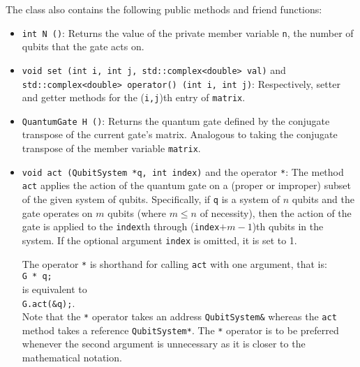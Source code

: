 \documentclass{article}
\begin{document}
The class also contains the following public methods and friend functions: 
\begin{itemize} 
\item \verb~int N ()~: Returns the value of the private member variable \verb~n~, the number of qubits that the gate acts on.

\item \verb~void set (int i, int j, std::complex<double> val)~ and \\
\verb~std::complex<double> operator() (int i, int j)~: Respectively, setter and getter methods for the (\verb~i,j~)th entry of \verb~matrix~. 

\item \verb~QuantumGate H ()~: Returns the quantum gate defined by the conjugate transpose of the current gate's matrix. Analogous to taking the conjugate transpose of the member variable \verb~matrix~. 

\item \verb~void act (QubitSystem *q, int index)~ and the operator \verb~*~: The method \verb~act~ applies the action of the quantum gate on a (proper or improper) subset of the given system of qubits. Specifically, if \verb~q~ is a system of $n$ qubits and the gate operates on $m$ qubits (where $m \le n$ of necessity), then the action of the gate is applied to the \verb~index~th through (\verb~index~$ + m - 1$)th qubits in the system. If the optional argument \verb~index~ is omitted, it is set to 1.

The operator \verb~*~ is shorthand for calling \verb~act~ with one argument, that is: \\ 
\hspace*{1em} \verb~G * q;~ \\ 
is equivalent to \\
\hspace*{1em} \verb~G.act(&q);~. \\ 
Note that the \verb~*~ operator takes an address \verb~QubitSystem&~ whereas the \verb~act~ method takes a reference \verb~QubitSystem*~. The \verb~*~ operator is to be preferred whenever the second argument is unnecessary as it is closer to the mathematical notation.  


\end{itemize}
\end{document}
